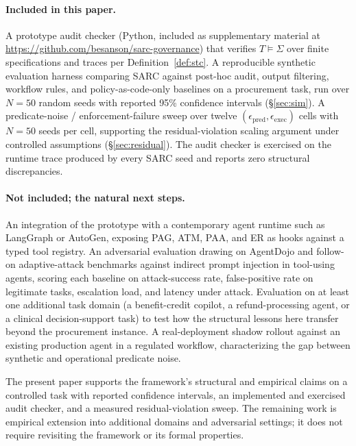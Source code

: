 \documentclass[11pt,a4paper]{article}
\theoremstyle{remark}
\begin{document}
\paragraph{Included in this paper.} A prototype audit checker (Python, included as supplementary material at \url{https://github.com/besanson/sarc-governance}) that verifies $T \models \Sigma$ over finite specifications and traces per Definition~\ref{def:stc}. A reproducible synthetic evaluation harness comparing SARC against post-hoc audit, output filtering, workflow rules, and policy-as-code-only baselines on a procurement task, run over $N=50$ random seeds with reported 95\% confidence intervals (\S\ref{sec:sim}). A predicate-noise / enforcement-failure sweep over twelve $(\epsilon_{\text{pred}}, \epsilon_{\text{exec}})$ cells with $N=50$ seeds per cell, supporting the residual-violation scaling argument under controlled assumptions (\S\ref{sec:residual}). The audit checker is exercised on the runtime trace produced by every SARC seed and reports zero structural discrepancies.

\paragraph{Not included; the natural next steps.} An integration of the prototype with a contemporary agent runtime such as LangGraph or AutoGen, exposing PAG, ATM, PAA, and ER as hooks against a typed tool registry. An adversarial evaluation drawing on AgentDojo \cite{debenedetti2024agentdojo} and follow-on adaptive-attack benchmarks against indirect prompt injection in tool-using agents, scoring each baseline on attack-success rate, false-positive rate on legitimate tasks, escalation load, and latency under attack. Evaluation on at least one additional task domain (a benefit-credit copilot, a refund-processing agent, or a clinical decision-support task) to test how the structural lessons here transfer beyond the procurement instance. A real-deployment shadow rollout against an existing production agent in a regulated workflow, characterizing the gap between synthetic and operational predicate noise.

The present paper supports the framework's structural and empirical claims on a controlled task with reported confidence intervals, an implemented and exercised audit checker, and a measured residual-violation sweep. The remaining work is empirical extension into additional domains and adversarial settings; it does not require revisiting the framework or its formal properties.
\end{document}
